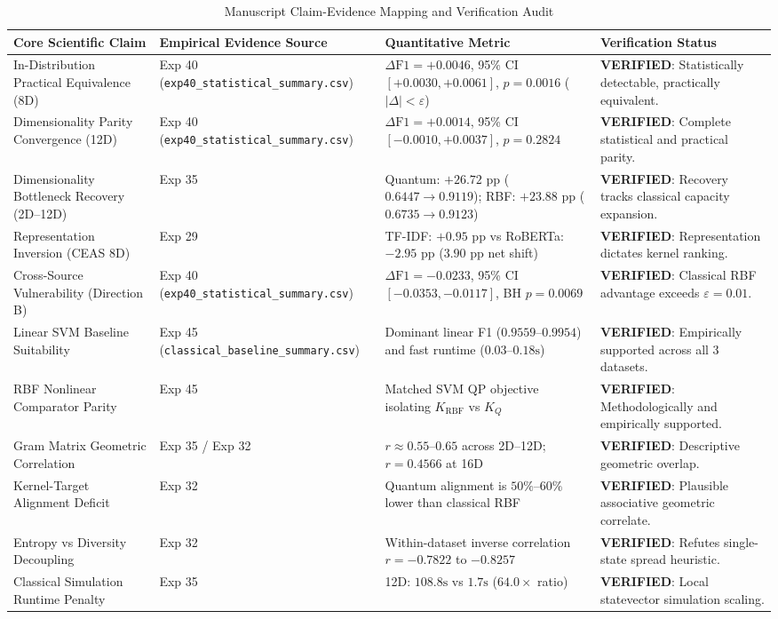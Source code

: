 \documentclass[10pt,letterpaper]{article}
\begin{document}
\begin{table}[h!]
\centering
\small
\caption{Manuscript Claim-Evidence Mapping and Verification Audit}
\label{tab:supp_claim_matrix_table}
\begin{tabular}{p{3.5cm}p{3.5cm}p{3.5cm}p{3.5cm}}
\toprule
\textbf{Core Scientific Claim} & \textbf{Empirical Evidence Source} & \textbf{Quantitative Metric} & \textbf{Verification Status} \\
\midrule
In-Distribution Practical Equivalence (8D) & Exp 40 (\texttt{exp40\_statistical\_summary.csv}) & $\Delta \text{F1} = +0.0046$, 95\% CI $[+0.0030, +0.0061]$, $p = 0.0016$ ($|\Delta| < \varepsilon$) & \textbf{VERIFIED}: Statistically detectable, practically equivalent. \\
Dimensionality Parity Convergence (12D) & Exp 40 (\texttt{exp40\_statistical\_summary.csv}) & $\Delta \text{F1} = +0.0014$, 95\% CI $[-0.0010, +0.0037]$, $p = 0.2824$ & \textbf{VERIFIED}: Complete statistical and practical parity. \\
Dimensionality Bottleneck Recovery (2D–12D) & Exp 35 & Quantum: $+26.72$ pp ($0.6447 \to 0.9119$); RBF: $+23.88$ pp ($0.6735 \to 0.9123$) & \textbf{VERIFIED}: Recovery tracks classical capacity expansion. \\
Representation Inversion (CEAS 8D) & Exp 29 & TF-IDF: $+0.95$ pp vs RoBERTa: $-2.95$ pp ($3.90$ pp net shift) & \textbf{VERIFIED}: Representation dictates kernel ranking. \\
Cross-Source Vulnerability (Direction B) & Exp 40 (\texttt{exp40\_statistical\_summary.csv}) & $\Delta \text{F1} = -0.0233$, 95\% CI $[-0.0353, -0.0117]$, BH $p = 0.0069$ & \textbf{VERIFIED}: Classical RBF advantage exceeds $\varepsilon = 0.01$. \\
Linear SVM Baseline Suitability & Exp 45 (\texttt{classical\_baseline\_summary.csv}) & Dominant linear F1 ($0.9559\text{--}0.9954$) and fast runtime ($0.03\text{--}0.18\text{s}$) & \textbf{VERIFIED}: Empirically supported across all 3 datasets. \\
RBF Nonlinear Comparator Parity & Exp 45 & Matched SVM QP objective isolating $K_{\text{RBF}}$ vs $K_Q$ & \textbf{VERIFIED}: Methodologically and empirically supported. \\
Gram Matrix Geometric Correlation & Exp 35 / Exp 32 & $r \approx 0.55\text{--}0.65$ across 2D–12D; $r = 0.4566$ at 16D & \textbf{VERIFIED}: Descriptive geometric overlap. \\
Kernel-Target Alignment Deficit & Exp 32 & Quantum alignment is $50\%\text{--}60\%$ lower than classical RBF & \textbf{VERIFIED}: Plausible associative geometric correlate. \\
Entropy vs Diversity Decoupling & Exp 32 & Within-dataset inverse correlation $r = -0.7822$ to $-0.8257$ & \textbf{VERIFIED}: Refutes single-state spread heuristic. \\
Classical Simulation Runtime Penalty & Exp 35 & 12D: $108.8\text{s}$ vs $1.7\text{s}$ ($64.0\times$ ratio) & \textbf{VERIFIED}: Local statevector simulation scaling. \\
\bottomrule
\end{tabular}
\end{table}



\end{document}
